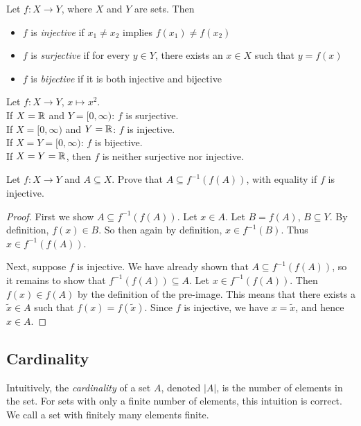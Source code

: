 \documentclass{article}
\begin{document}
\begin{definition}
Let $f:X \to Y$, where $X$ and $Y$ are sets. Then
\begin{itemize}
    \item $f$ is \emph{injective} if $x_1 \neq x_2$ implies $f(x_1) \neq f(x_2)$
    \item $f$ is \emph{surjective} if for every $y \in Y$, there exists an $x \in X$ such that $y = f(x)$
    \item $f$ is \emph{bijective} if it is both injective and bijective
\end{itemize}
\end{definition}

\begin{example}
Let $f:X \to Y$, $ x \mapsto x^2$. \\
If $X = {\mathbb{R}}$ and $Y= [0,\infty)$: $f$ is surjective. \\
If $X = [0,\infty)$ and $Y = {\mathbb{R}}$: $f$ is injective. \\
If $X = Y = [0,\infty)$: $f$ is bijective. \\
If $X=Y={\mathbb{R}}$, then $f$ is neither surjective nor injective.
\end{example}

\begin{proposition}
\label{prop:set_subset_preim_im}
Let $f: X \to Y$ and $A \subseteq X$. Prove that $A \subseteq f^{-1}(f(A))$, with equality if $f$ is injective. 
\end{proposition}
\begin{proof}
First we show $A \subseteq f^{-1}(f(A))$.
Let $x \in A$. Let $B = f(A)$, $B \subseteq Y$. By definition, $f(x) \in B$. So then again by definition, $x \in f^{-1}(B)$. Thus $x \in f^{-1}(f(A))$.

Next, suppose $f$ is injective. We have already shown that $A \subseteq f^{-1}(f(A))$, so it remains to show that  $f^{-1}(f(A)) \subseteq  A$. Let $x \in f^{-1}(f(A))$. Then $f(x) \in f(A)$ by the definition of the pre-image. This means that there exists a $\tilde x \in A$ such that $f(x) = f(\tilde x)$. Since $f$ is injective, we have $x = \tilde x$, and hence $x \in A$.
\end{proof}

\subsection{Cardinality}

Intuitively, the \emph{cardinality} of a set $A$, denoted $|A|$, is the number of elements in the set. For sets with only a finite number of elements, this intuition is correct. We call a set with finitely many elements finite. 
\end{document}
